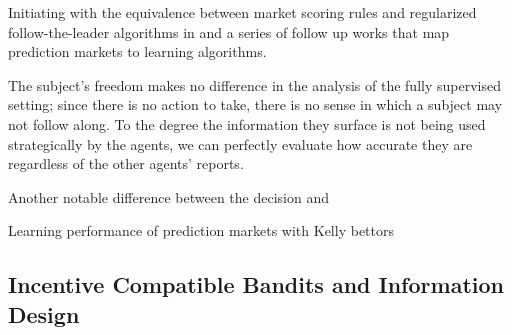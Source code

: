 

Initiating with the equivalence between market scoring rules and regularized follow-the-leader algorithms in \cite{chen2010new} and a series of follow up works \cite{abernethy2013efficient, frongillo2012interpreting, hu2014multi, frongillo2015convergence,} that map prediction markets to learning algorithms. 

The subject's freedom makes no difference in the analysis of the fully supervised setting; since there is no action to take, there is no sense in which a subject may not follow along. To the degree the information they surface is not being used strategically by the agents, we can perfectly evaluate how accurate they are regardless of the other agents' reports.





Another notable difference between the decision and 

Learning performance of prediction markets with Kelly bettors\cite{beygelzimer2012learning}

\subsection{Incentive Compatible Bandits and Information Design}



